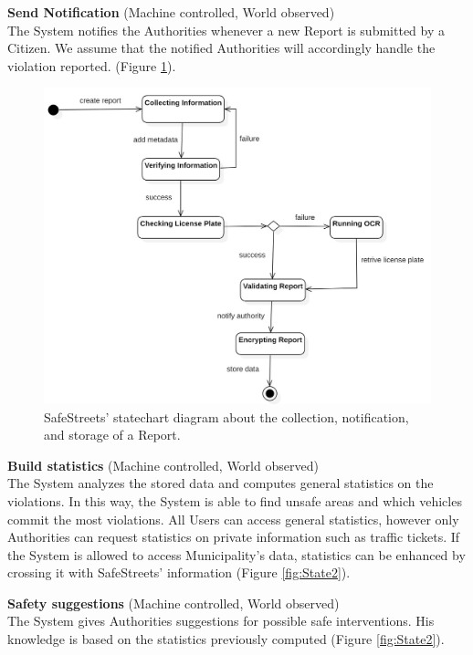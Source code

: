 \documentclass{report}
\begin{document}
\noindent\textbf{Send Notification} (Machine controlled, World observed)\\
The System notifies the Authorities whenever a new Report is submitted by a Citizen. 
We assume that the notified Authorities will accordingly handle the violation reported. (Figure \ref{fig:State1}).
\begin{figure}[!ht]
\begin{center}
\includegraphics[width=.8\textwidth]{./img/Statechart_Report.jpg}
\end{center}
\caption{SafeStreets' statechart diagram about the collection, notification, and storage of a Report.}
\label{fig:State1}
\end{figure} 
\newpage
\noindent\textbf{Build statistics} (Machine controlled, World observed)\\
The System analyzes the stored data and computes general statistics on the violations. In this way, the System is able to find unsafe areas and which vehicles commit the most violations. All Users can access general statistics, however only Authorities can request statistics on private information such as traffic tickets. If the System is allowed to access Municipality's data, statistics can be enhanced by crossing it with SafeStreets' information (Figure \ref{fig:State2}).  \\ \vspace{2mm}

\noindent\textbf{Safety suggestions} (Machine controlled, World observed)\\
The System gives Authorities suggestions for possible safe interventions. His knowledge is based on the statistics previously computed (Figure \ref{fig:State2}).
\end{document}
